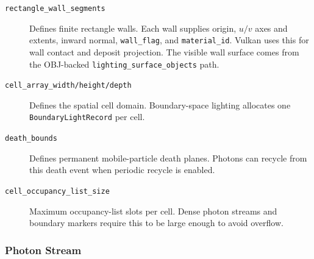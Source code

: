 \begin{description}
    \item[\texttt{rectangle\_wall\_segments}] Defines finite rectangle walls.
    Each wall supplies origin, \(u/v\) axes and extents, inward normal,
    \texttt{wall\_flag}, and \texttt{material\_id}.  Vulkan uses this for
    wall contact and deposit projection.  The visible wall surface comes from
    the OBJ-backed \texttt{lighting\_surface\_objects} path.
    \item[\texttt{cell\_array\_width/height/depth}] Defines the spatial cell
    domain.  Boundary-space lighting allocates one \texttt{BoundaryLightRecord}
    per cell.
    \item[\texttt{death\_bounds}] Defines permanent mobile-particle death
    planes.  Photons can recycle from this death event when periodic recycle
    is enabled.
    \item[\texttt{cell\_occupancy\_list\_size}] Maximum occupancy-list slots
    per cell.  Dense photon streams and boundary markers require this to be
    large enough to avoid overflow.
\end{description}

\subsubsection{Photon Stream}

